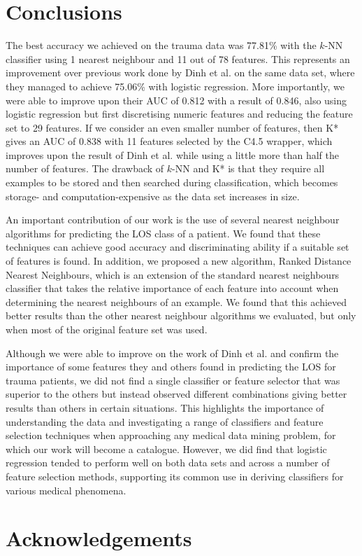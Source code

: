 \documentclass{article}
\begin{document}
\section{Conclusions}
\label{sec:conclusions}
The best accuracy we achieved on the trauma data was 77.81\% with the $k$-NN
classifier using 1 nearest neighbour and 11 out of 78 features. This represents
an improvement over previous work done by Dinh et al. \cite{Dinh2013a}
on the same data set,
where they managed to achieve 75.06\% with logistic regression. More
importantly, we were able to improve upon their AUC of 0.812 with a result of
0.846, also using logistic regression but first discretising numeric features
and reducing the feature set to 29 features.
If we consider an even smaller number of features, then K*
gives an AUC of 0.838 with 11 features selected by the C4.5 wrapper, which
improves upon the result of Dinh et al. \cite{Dinh2013a} while using a little
more than half
the number of features. The drawback of $k$-NN and K* is that they require all
examples to be stored and then searched during classification, which becomes
storage- and computation-expensive as the data set increases in size.

An important contribution of our work is the use of several nearest neighbour
algorithms for predicting the LOS class of a patient. We found that these
techniques can achieve good accuracy and discriminating ability if a suitable
set of features is found. In addition, we proposed a new algorithm, Ranked
Distance Nearest Neighbours, which is an extension of the standard nearest
neighbours classifier that takes the relative importance
of each feature into account when determining the nearest neighbours of an
example. We found that this achieved better results than the other nearest
neighbour algorithms we evaluated, but only when most of the original feature
set was used.

Although we were able to improve on the work of Dinh et al. \cite{Dinh2013a}
and confirm the
importance of some features they and others found in predicting the LOS for
trauma patients, we did not find a single classifier or feature selector
that was superior to the others but instead observed different combinations
giving better results than others in certain situations. This highlights the
importance of understanding the data and investigating a range of classifiers
and feature selection techniques when approaching any medical data mining
problem, for which our work will become a catalogue.
However, we did find that logistic regression tended to perform well
on both data sets and across a number of feature selection methods, supporting
its common use in deriving classifiers for various medical phenomena.

\section*{Acknowledgements}

{
  
}
\end{document}
